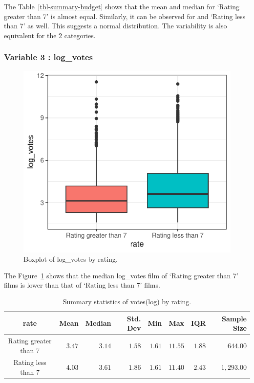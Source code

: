 \documentclass[
  letterpaper,
  DIV=11,
  numbers=noendperiod]{scrartcl}
\begin{document}
The Table~\ref{tbl-summary-budget} shows that the mean and median for
`Rating greater than 7' is almost equal. Similarly, it can be observed
for and `Rating less than 7' as well. This suggests a normal
distribution. The variability is also equivalent for the 2 categories.

\clearpage

\hypertarget{variable-3-log_votes}{%
\subsubsection{Variable 3 : log\_votes}\label{variable-3-log_votes}}

\begin{figure}

{\centering \includegraphics{Group_06_Analysis_files/figure-pdf/fig-boxplot-logvotes-1.pdf}

}

\caption{\label{fig-boxplot-logvotes}Boxplot of log\_votes by rating.}

\end{figure}

The Figure~\ref{fig-boxplot-logvotes} shows that the median log\_votes
film of `Rating greater than 7' films is lower than that of `Rating less
than 7' films.

\hypertarget{tbl-summary-logvotes}{}
\begin{longtable}{crrrrrrr}
\caption{\label{tbl-summary-logvotes}Summary statistics of votes(log) by rating. }\tabularnewline

\toprule
rate & Mean & Median & Std. Dev & Min & Max & IQR & Sample Size \\ 
\midrule\addlinespace[2.5pt]
Rating greater than 7 & $3.47$ & $3.14$ & $1.58$ & $1.61$ & $11.55$ & $1.88$ & $644.00$ \\ 
Rating less than 7 & $4.03$ & $3.61$ & $1.86$ & $1.61$ & $11.40$ & $2.43$ & $1,293.00$ \\ 
\bottomrule
\end{longtable}
\end{document}
